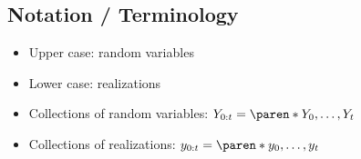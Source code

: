 \subsection*{Notation / Terminology}

\begin{itemize}
    \item Upper case: random variables
    \item Lower case: realizations
    \item Collections of random variables: $Y_{0:t} = \paren*{Y_{0}, \ldots, Y_{t}}$
    \item Collections of realizations: $y_{0:t} = \paren*{y_{0}, \ldots, y_{t}}$
\end{itemize}